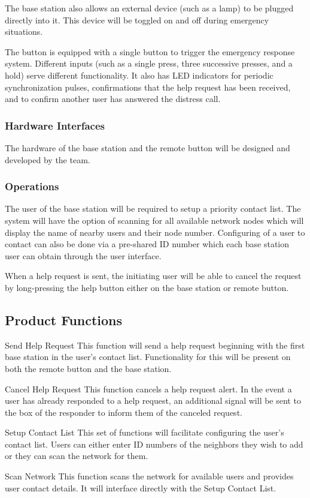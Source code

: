 \documentclass[journal,compsoc]{IEEEtran}
\begin{document}
The base station also allows an external device (such as a lamp) to be plugged directly into it. This device will be toggled on and off during emergency situations.

The button is equipped with a single button to trigger the emergency response system. Different inputs (such as a single press, three successive presses, and a hold) serve different functionality. It also has LED indicators for periodic synchronization pulses, confirmations that the help request has been received, and to confirm another user has answered the distress call.

\subsubsection{Hardware Interfaces}
The hardware of the base station and the remote button will be designed and developed by the team.

\subsubsection{Operations}
The user of the base station will be required to setup a priority contact list.  The system will have the option of scanning for all available network nodes which will display the name of nearby users and their node number.  Configuring of a user to contact can also be done via a pre-shared ID number which each base station user can obtain through the user interface.

When a help request is sent, the initiating user will be able to cancel the request by long-pressing the help button either on the base station or remote button.

\subsection{Product Functions}

\begin{LaTeXdescription}
\item[Send Help Request] This function will send a help request beginning with the first base station in the user’s contact list. Functionality for this will be present on both the remote button and the base station.
\item[Cancel Help Request] This function cancels a help request alert. In the event a user has already responded to a help request, an additional signal will be sent to the box of the responder to inform them of the canceled request.
\item[Setup Contact List] This set of functions will facilitate configuring the user’s contact list.  Users can either enter ID numbers of the neighbors they wish to add or they can scan the network for them.
\item[Scan Network] This function scans the network for available users and provides user contact details. It will interface directly with the Setup Contact List.
\end{LaTeXdescription}
\end{document}
